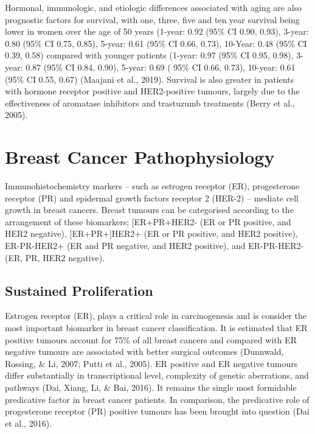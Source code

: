 \documentclass[a4paper, twoside]{templates/ociamthesis}
\begin{document}
Hormonal, immunologic, and etiologic differences associated with aging are also prognostic factors for survival, with one, three, five and ten year survival being lower in women over the age of 50 years (1-year: 0.92 (95\% CI 0.90, 0.93), 3-year: 0.80 (95\% CI 0.75, 0.85), 5-year: 0.61 (95\% CI 0.66, 0.73), 10-Year: 0.48 (95\% CI 0.39, 0.58) compared with younger patients (1-year: 0.97 (95\% CI 0.95, 0.98), 3-year: 0.87 (95\% CI 0.84, 0.90), 5-year: 0.69 ( 95\% CI 0.66, 0.73), 10-year: 0.61 (95\% CI 0.55, 0.67) (Maajani et al., 2019). Survival is also greater in patients with hormone receptor positive and HER2-positive tumours, largely due to the effectiveness of aromatase inhibitors and trastuzumb treatments (Berry et al., 2005).

\hypertarget{breast-cancer-pathophysiology}{%
\section{Breast Cancer Pathophysiology}\label{breast-cancer-pathophysiology}}

Immunohistochemistry markers -- such as estrogen receptor (ER), progesterone receptor (PR) and epidermal growth factors receptor 2 (HER-2) -- mediate cell growth in breast cancers. Breast tumours can be categorised according to the arrangement of these biomarkers; {[}ER+\textbar PR+\textbar HER2- (ER or PR positive, and HER2 negative), {[}ER+\textbar PR+{]}HER2+ (ER or PR positive, and HER2 positive), ER-PR-HER2+ (ER and PR negative, and HER2 positive), and ER-PR-HER2- (ER, PR, HER2 negative).

\hypertarget{sustained-proliferation}{%
\subsection{Sustained Proliferation}\label{sustained-proliferation}}

Estrogen receptor (ER), plays a critical role in carcinogenesis and is consider the most important biomarker in breast cancer classification. It is estimated that ER positive tumours account for 75\% of all breast cancers and compared with ER negative tumours are associated with better surgical outcomes (Dunnwald, Rossing, \& Li, 2007; Putti et al., 2005). ER positive and ER negative tumours differ substantially in transcriptional level, complexity of genetic aberrations, and pathways (Dai, Xiang, Li, \& Bai, 2016). It remains the single most formidable predicative factor in breast cancer patients. In comparison, the predicative role of progesterone receptor (PR) positive tumours has been brought into question (Dai et al., 2016).
\end{document}
